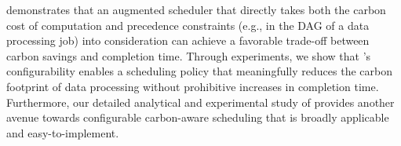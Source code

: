 
\DANISH demonstrates that an augmented scheduler that directly takes both the carbon cost of computation and precedence constraints (e.g., in the DAG of a data processing job) into consideration can achieve a favorable trade-off between carbon savings and completion time.  Through experiments, we show that \DANISH's configurability enables a scheduling policy that meaningfully reduces the carbon footprint of data processing without prohibitive increases in completion time.  Furthermore, our detailed analytical and experimental study of \CAP provides another avenue towards configurable carbon-aware scheduling that is broadly applicable and easy-to-implement.  


